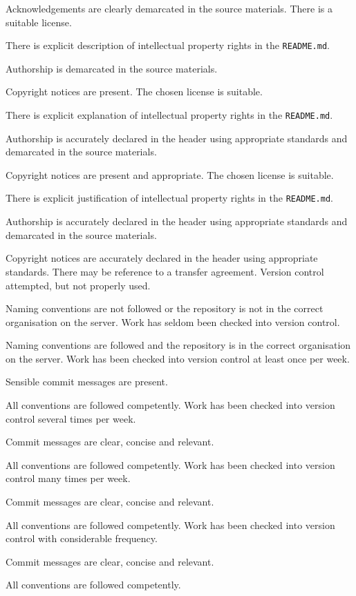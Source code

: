 \documentclass{../../fal_assignment}
\begin{document}
\begin{markingrubric}
            \par Acknowledgements are clearly demarcated in the source materials.
        \grade There is a suitable license.
            \par There is explicit description of intellectual property rights in the \texttt{README.md}.
            \par Authorship is demarcated in the source materials.
            \par Copyright notices are present.
        \grade The chosen license is suitable. 
            \par There is explicit explanation of intellectual property rights in the \texttt{README.md}.
            \par Authorship is accurately declared in the header using appropriate standards and demarcated in the source materials.
            \par Copyright notices are present and appropriate.
        \grade The chosen license is suitable.
            \par There is explicit justification of intellectual property rights in the \texttt{README.md}.
            \par Authorship is accurately declared in the header using appropriate standards and demarcated in the source materials.
            \par Copyright notices are accurately declared in the header using appropriate standards. There may be reference to a transfer agreement.
%
        \grade\fail Version control attempted, but not properly used.
            \par Naming conventions are not followed or the repository is not in the correct organisation on the server.
        \grade Work has seldom been checked into version control.
            \par Naming conventions are followed and the repository is in the correct organisation on the server.
        \grade Work has been checked into version control at least once per week.
            \par Sensible commit messages are present.
            \par All conventions are followed competently.
        \grade Work has been checked into version control several times per week.
            \par Commit messages are clear, concise and relevant.
            \par All conventions are followed competently.
        \grade Work has been checked into version control many times per week.
            \par Commit messages are clear, concise and relevant.
            \par All conventions are followed competently.
        \grade Work has been checked into version control with considerable frequency.
            \par Commit messages are clear, concise and relevant.
            \par All conventions are followed competently.
%
\end{markingrubric}
\end{document}
